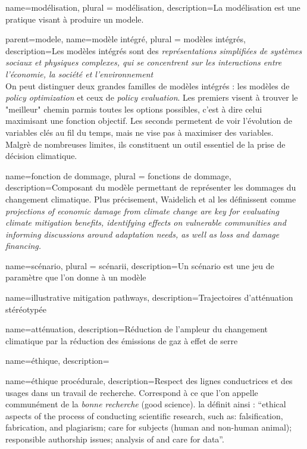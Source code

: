 {
    name=modélisation, 
    plural = modélisation, 
    description={La modélisation est une pratique visant à produire un \gls{modele}.}
}

{
    parent=modele,
    name=modèle intégré, 
    plural = modèles intégrés, 
    description={Les modèles intégrés sont des \textit{représentations simplifiées de systèmes sociaux et physiques complexes, qui se concentrent sur les interactions entre l'économie, la société et l'environnement} \cite{intergovernmental_panel_on_climate_change_ipcc_annex_2023}  \\
    On peut distinguer deux grandes familles de modèles intégrés : les modèles de \textit{policy optimization} et ceux de \textit{policy evaluation}. Les premiers visent à trouver le "meilleur" chemin parmis toutes les options possibles, c'est à dire celui maximisant une fonction objectif. Les seconds permetent de voir l'évolution de variables clés au fil du temps, mais ne vise pas à maximiser des variables. \\
    Malgrè de nombreuses limites, ils constituent un outil essentiel de la prise de décision climatique.
    }
}

{
    name=fonction de dommage, 
    plural = fonctions de dommage, 
    description={Composant du modèle permettant de représenter les dommages du changement climatique. Plus précisement, Waidelich et al \cite{waidelich_climate_2024} les définissent comme \emph{projections of economic damage from climate change are key for evaluating climate mitigation benefits, identifying effects on vulnerable communities and informing discussions around adaptation needs, as well as loss and damage financing.}}
}

{
    name=scénario,
    plural = scénarii, 
    description={Un scénario est une jeu de paramètre que l'on donne à un modèle}
}

{
    name=illustrative mitigation pathways, 
    description={Trajectoires d'atténuation stéréotypée}
}

{
    name=atténuation, 
    description={Réduction de l'ampleur du changement climatique par la réduction des émissions de gaz à effet de serre}
}


{
    name=éthique, 
    description={}
}

{
    name=éthique procédurale, 
    description={Respect des lignes conductrices et des usages dans un travail de recherche. Correspond à ce que l'on appelle communément de la \textit{bonne recherche} (good science). \cite{tuana_leading_2010} la définit ainsi : \enquote{ethical aspects of the process of conducting scientific research, such as: falsification, fabrication, and plagiarism; care for subjects (human and non-human animal); responsible authorship issues; analysis of and care for data}.}
}

